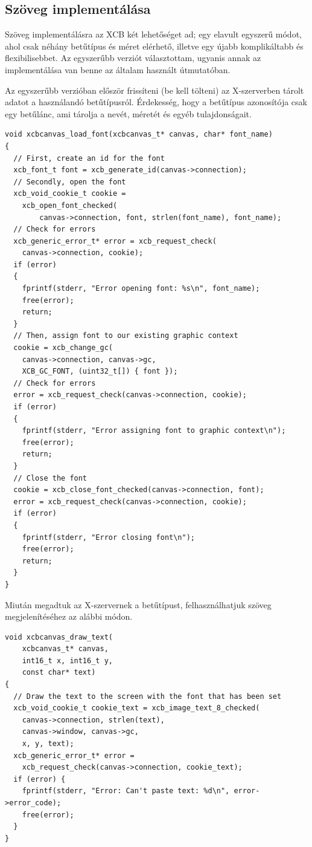 \subsection{Szöveg implementálása}

Szöveg implementálásra az XCB két lehetőséget ad; egy elavult egyszerű módot, ahol csak néhány betűtípus és méret elérhető, illetve egy újabb komplikáltabb és flexibilisebbet. Az egyszerűbb verziót választottam, ugyanis annak az implementálása van benne az általam használt útmutatóban.

Az egyszerűbb verzióban először frissíteni (be kell tölteni) az X-szerverben tárolt adatot a használandó betűtípusról. Érdekesség, hogy a betűtípus azonosítója csak egy betűlánc, ami tárolja a nevét, méretét és egyéb tulajdonságait.

\begin{verbatim}
void xcbcanvas_load_font(xcbcanvas_t* canvas, char* font_name)
{
  // First, create an id for the font
  xcb_font_t font = xcb_generate_id(canvas->connection);
  // Secondly, open the font
  xcb_void_cookie_t cookie =
    xcb_open_font_checked(
        canvas->connection, font, strlen(font_name), font_name);
  // Check for errors
  xcb_generic_error_t* error = xcb_request_check(
    canvas->connection, cookie);
  if (error)
  {
    fprintf(stderr, "Error opening font: %s\n", font_name);
    free(error);
    return;
  }
  // Then, assign font to our existing graphic context
  cookie = xcb_change_gc(
    canvas->connection, canvas->gc,
    XCB_GC_FONT, (uint32_t[]) { font });
  // Check for errors
  error = xcb_request_check(canvas->connection, cookie);
  if (error)
  {
    fprintf(stderr, "Error assigning font to graphic context\n");
    free(error);
    return;
  }
  // Close the font
  cookie = xcb_close_font_checked(canvas->connection, font);
  error = xcb_request_check(canvas->connection, cookie);
  if (error)
  {
    fprintf(stderr, "Error closing font\n");
    free(error);
    return;
  }
}
\end{verbatim}

Miután megadtuk az X-szervernek a betűtípust, felhasználhatjuk szöveg megjelenítéséhez az alábbi módon.

\begin{verbatim}
void xcbcanvas_draw_text(
    xcbcanvas_t* canvas,
    int16_t x, int16_t y,
    const char* text)
{
  // Draw the text to the screen with the font that has been set
  xcb_void_cookie_t cookie_text = xcb_image_text_8_checked(
    canvas->connection, strlen(text),
    canvas->window, canvas->gc,
    x, y, text);
  xcb_generic_error_t* error =
    xcb_request_check(canvas->connection, cookie_text);
  if (error) {
    fprintf(stderr, "Error: Can't paste text: %d\n", error->error_code);
    free(error);
  }
}
\end{verbatim}

